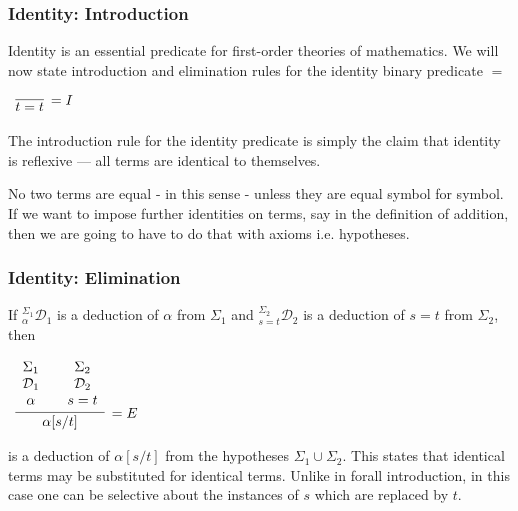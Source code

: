 \documentclass{beamer}
\theoremstyle{indentDefn} \newtheorem{defn}[]{Definition}
\begin{document}
\begin{frame}
	\frametitle{Identity: Introduction}

	Identity is an essential predicate for first-order theories of mathematics. We will now state introduction and elimination rules for the identity binary predicate $=$ 

	\vspace{2mm}

	\begin{center}
		$\begin{array}{c}
			\infer[= I]{t = t}
				{}
		\end{array}$
	\end{center}

	\vspace{2mm}

	The introduction rule for the identity predicate is simply the claim that identity is reflexive --- all terms are identical to themselves. 

	\vspace{2mm}

	No two terms are equal - in this sense - unless they are equal symbol for symbol. If we want to impose further identities on terms, say in the definition of addition, then we are going to have to do that with axioms i.e. hypotheses. 
\end{frame}

\begin{frame}
	\frametitle{Identity: Elimination}

	If $^{\Sigma_{1}}_{\alpha}\mathcal{D}_{1}$ is a deduction of $\alpha$ from $\Sigma_{1}$ and $^{\Sigma_{2}}_{s=t}\mathcal{D}_{2}$ is a deduction of $s = t$ from $\Sigma_{2}$, then

	\begin{center}
		$\begin{array}{c}
			\infer[= E]{\alpha[s/t]}
				{\begin{array}{c} \Sigma_{1} \\ \mathcal{D}_{1} \\ \alpha \end{array}
				&
				\begin{array}{c} \Sigma_{2} \\ \mathcal{D}_{2} \\ s = t \end{array}}			
		\end{array}$
	\end{center}

	is a deduction of $\alpha[s/t]$ from the hypotheses $\Sigma_{1} \cup \Sigma_{2}$. This states that identical terms may be substituted for identical terms. Unlike in forall introduction, in this case one can be selective about the instances of $s$ which are replaced by $t$. 

	\vspace{30mm}

\end{frame}
\end{document}
